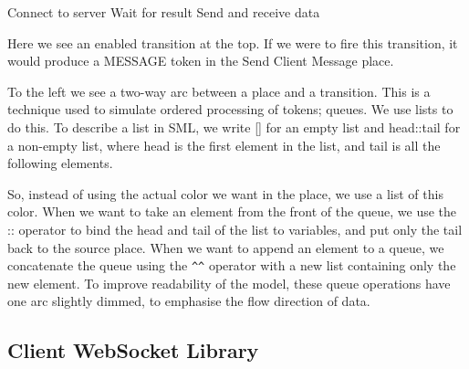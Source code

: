 Connect to server
Wait for result
Send and receive data

Here we see an enabled transition at the top. If we were to fire this
transition, it would produce a MESSAGE token in the Send Client Message place.

To the left we see a two-way arc between a place and a transition. This is a
technique used to simulate ordered processing of tokens; queues. We use
lists to do this. To describe a list in SML, we write [] for an empty list and
head::tail for a non-empty list, where head is the first element in the list,
and tail is all the following elements.

So, instead of using the actual color we want in the place, we use a list of
this color. When we want to take an element from the front of the queue,
we use the :: operator to bind the head and tail of the list to variables, and
put only the tail back to the source place. When we want to append an element
to a queue, we concatenate the queue using the \verb|^^| operator with a new
list containing only the new element. To improve readability of the model, these queue operations have
one arc slightly dimmed, to emphasise the flow direction of data.


\subsection{Client WebSocket Library}

